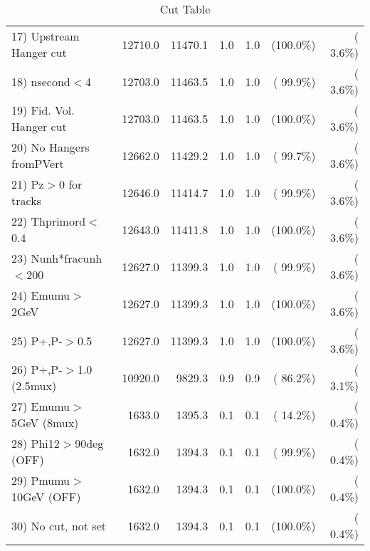 \begin{table}[h!]
\begin{tabular}{||l||r|r|r|r|r|r||}
 17) Upstream Hanger cut  &      12710.0 &      11470.1 &          1.0 &          1.0 & (100.0\%) & (  3.6\%) \\
 18) nsecond$<$4          &      12703.0 &      11463.5 &          1.0 &          1.0 & ( 99.9\%) & (  3.6\%) \\
 19) Fid. Vol. Hanger cut &      12703.0 &      11463.5 &          1.0 &          1.0 & (100.0\%) & (  3.6\%) \\
 20) No Hangers fromPVert &      12662.0 &      11429.2 &          1.0 &          1.0 & ( 99.7\%) & (  3.6\%) \\
 21) Pz$>$0 for tracks    &      12646.0 &      11414.7 &          1.0 &          1.0 & ( 99.9\%) & (  3.6\%) \\
 22) Thprimord$<$0.4      &      12643.0 &      11411.8 &          1.0 &          1.0 & (100.0\%) & (  3.6\%) \\
 23) Nunh*fracunh$<$200   &      12627.0 &      11399.3 &          1.0 &          1.0 & ( 99.9\%) & (  3.6\%) \\
 24) Emumu$>$2GeV         &      12627.0 &      11399.3 &          1.0 &          1.0 & (100.0\%) & (  3.6\%) \\
 25) P+,P-$>$0.5          &      12627.0 &      11399.3 &          1.0 &          1.0 & (100.0\%) & (  3.6\%) \\
 26) P+,P-$>$1.0 (2.5mux) &      10920.0 &       9829.3 &          0.9 &          0.9 & ( 86.2\%) & (  3.1\%) \\
 27) Emumu$>$5GeV  (8mux) &       1633.0 &       1395.3 &          0.1 &          0.1 & ( 14.2\%) & (  0.4\%) \\
 28) Phi12$>$90deg  (OFF) &       1632.0 &       1394.3 &          0.1 &          0.1 & ( 99.9\%) & (  0.4\%) \\
 29) Pmumu$>$10GeV  (OFF) &       1632.0 &       1394.3 &          0.1 &          0.1 & (100.0\%) & (  0.4\%) \\
 30) No cut, not set      &       1632.0 &       1394.3 &          0.1 &          0.1 & (100.0\%) & (  0.4\%) \\
 \hline
 \hline
 \end{tabular}
 \caption{Cut Table           }
 \label{tab-cutcohjpsi-mumu_jpsi}
 \end{table}
